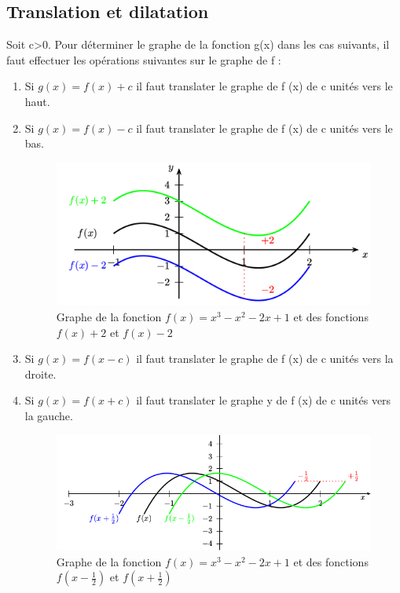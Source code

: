 \documentclass[a4paper,10pt]{book}
\begin{document}
\subsection{Translation et dilatation}
Soit c>0. Pour déterminer le graphe de la fonction g(x) dans les cas suivants, il faut effectuer les opérations suivantes sur le graphe de f :\\ \begin{enumerate}
\item Si $g(x)=f(x)+c$ il faut translater le graphe de f (x) de c unités vers le haut.
\item Si $g(x)=f(x)-c$ il faut translater le graphe de f (x) de c unités vers le bas.\\
\begin{figure}[h] \begin{center} \includegraphics[scale=0.5]{images/019.png} \caption{Graphe de la fonction $f(x)=x^{3}-x^{2}-2x+1$ et des fonctions $f(x)+2$ et $f(x)-2$} \end{center} \end{figure}
\item Si $g(x)=f(x-c)$ il faut translater le graphe de f (x) de c unités vers la droite.
\item Si $g(x)=f(x+c)$ il faut translater le graphe y de f (x) de c unités vers la gauche.
\begin{figure}[h] \begin{center} \includegraphics[scale=0.5]{images/020.png} \caption{Graphe de la fonction $f(x)=x^{3}-x^{2}-2x+1$ et des fonctions $f(x-\frac{1}{2})$ et $f(x+\frac{1}{2})$} \end{center} \end{figure}

\end{enumerate}
\end{document}
